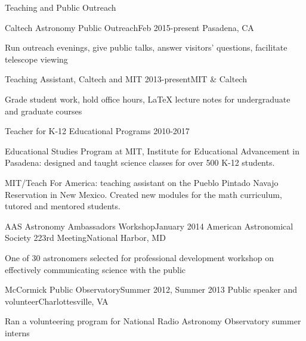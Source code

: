 \documentclass{resume} %
\begin{document}
\begin{rSection}{Teaching and Public Outreach}

  \begin{rSubsection}{Caltech Astronomy Public Outreach}{Feb 2015-present}
    {}{Pasadena, CA}
  \item Run outreach evenings, give public talks, answer visitors' questions,
    facilitate telescope viewing
  \end{rSubsection}

  \begin{rSubsection}{Teaching Assistant, Caltech and MIT} 
    {2013-present}{}{MIT \& Caltech}
  \item Grade student work, hold office hours, LaTeX lecture notes
    for undergraduate and graduate courses
  \end{rSubsection}

  \begin{rSubsection}{Teacher for K-12 Educational Programs}
    {2010-2017}{}{}
  \item Educational Studies Program at MIT,
    Institute for Educational Advancement in Pasadena:
    designed and taught science
    classes for over 500 K-12 students.
  \item MIT/Teach For America:
    teaching assistant on
    the Pueblo Pintado Navajo Reservation in New Mexico. 
    Created new modules for the math curriculum, 
    tutored and mentored students.
  \end{rSubsection}

  \begin{rSubsection}{AAS Astronomy Ambassadors Workshop}{January 2014}
  {American Astronomical Society 223rd Meeting}{National Harbor, MD}
  \item One of 30 astronomers selected for professional development workshop on effectively communicating science with the public
  \end{rSubsection}

  \begin{rSubsection}{McCormick Public Observatory}{Summer 2012, Summer 2013}
    {Public speaker and volunteer}{Charlottesville, VA}
  \item Ran a volunteering program for National Radio Astronomy Observatory summer interns
  \end{rSubsection}

\end{rSection}
\end{document}
